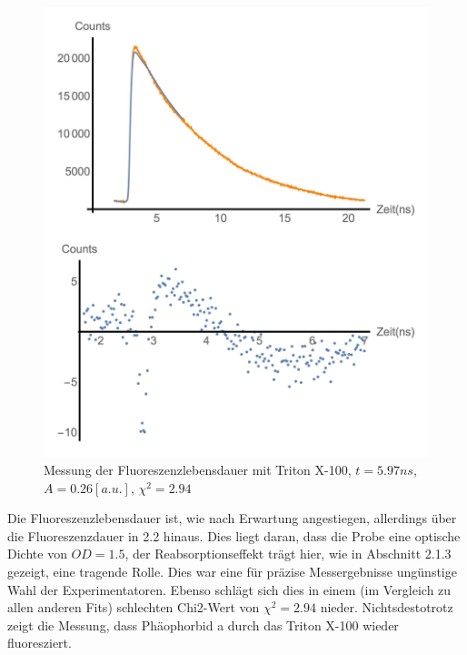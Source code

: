 \documentclass{article}
\begin{document}
\begin{figure}[h]
  \centering
  \includegraphics[width=\textwidth/2]{Bilder/FitTriton.jpg}
  \caption{Messung der Fluoreszenzlebensdauer mit Triton X-100, $t = 5.97ns$, $A = 0.26[a.u.]$, $\chi^2 = 2.94$}
\end{figure}

Die Fluoreszenzlebensdauer ist, wie nach Erwartung angestiegen, allerdings über die Fluoreszenzdauer in 2.2 hinaus. Dies liegt daran, dass
die Probe eine optische Dichte von $OD = 1.5$, der Reabsorptionseffekt trägt hier, wie in Abschnitt 2.1.3 gezeigt, eine tragende Rolle. Dies war
eine für präzise Messergebnisse ungünstige Wahl der Experimentatoren. Ebenso schlägt sich dies in einem (im Vergleich zu allen anderen Fits)
schlechten Chi2-Wert von $\chi^2=2.94$ nieder. Nichtsdestotrotz zeigt die Messung, dass Phäophorbid a durch das Triton X-100 wieder fluoresziert.
\end{document}
